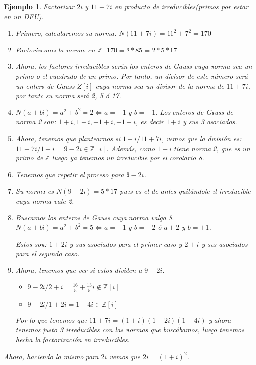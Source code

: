 \documentclass[11pt, a4paper, titlepage]{article}
\providecommand{\ent}{\mathbb{Z}}
\theoremstyle{theorem-style}
\theoremstyle{definition-style}
\theoremstyle{remark-style}
\theoremstyle{example-style}
\newtheorem*{ejemplo}{Ejemplo}
\begin{document}
\begin{ejemplo}
	Factorizar $2i$ y $11+7i$ en producto de irreducibles(primos por estar en un DFU).
	
	\begin{enumerate}
	\item Primero, calcularemos su norma. $N(11+7i) = 11^2 + 7^2 = 170$
	\item Factorizamos la norma en $\ent$. $170 = 2*85 = 2*5 *17$.
	\item Ahora, los factores irreducibles serán los enteros de Gauss cuya norma sea un primo o el cuadrado de un primo. Por tanto, un divisor de este número será un entero de Gauss $Z[i]$ cuya norma sea un divisor de la norma de $11+7i$, por tanto su norma será 2, 5 ó 17.
	\item  $N(a+bi) = a^2 +b^2 = 2 \iff a=\pm 1$ y $b= \pm 1.$ Los enteros de Gauss de norma 2 son: $1+i,1-i,-1+i,-1-i$, es decir $1+i$ y sus 3 asociados.
	\item Ahora, tenemos que plantearnos si $1+i / 11+7i$, vemos que la división es: $11+7i/1+i = 9-2i\in \ent[i]$. Además, como $1+i$ tiene norma 2, que es un primo de $\ent$ luego ya tenemos un irreducible por el corolario 8. 
	\item Tenemos que repetir el proceso para $9-2i$.
	\item Su norma es $N(9-2i) = 5*17$ pues es el de antes quitándole el irreducible cuya norma vale 2.
	\item Buscamos los enteros de Gauss cuya norma valga 5. $N(a+bi) = a^2 +b^2 = 5 \iff a = \pm 1$ y $b =\pm 2$ ó $a \pm 2$ y $b = \pm 1$.
	
	Estos son: $1+2i$ y sus asociados para el primer caso y $2+i$ y sus asociados para el segundo caso.
	
	\item Ahora, tenemos que ver si estos dividen a $9-2i$. 
	\begin{itemize}
	\item $9-2i/2+i  = \frac{16}{5} + \frac{13}{5}i \notin \ent[i]$
	\item $9-2i /1+2i = 1-4i \in \ent[i]$
\end{itemize}

Por lo que tenemos que $11+7i = (1+i)(1+2i)(1-4i)$ y ahora tenemos justo 3 irreducibles con las normas que buscábamos, luego tenemos hecha la factorización en irreducibles.
	
\end{enumerate}

Ahora, haciendo lo mismo para $2i$ vemos que $2i = (1+i)^2$.

	
\end{ejemplo}
\end{document}
